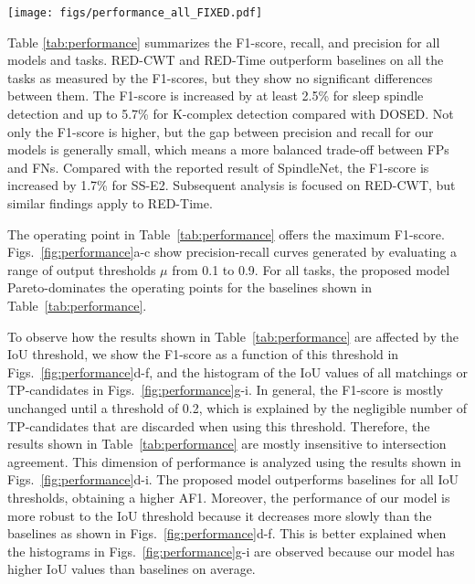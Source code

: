 \documentclass[conference]{IEEEtran}
\begin{document}
\begin{figure*}
\centering \texttt{[image: figs/performance\_all\_FIXED.pdf]}
\caption{
RED-CWT outperforms baselines in the tasks of sleep spindle detection according to expert E1 (first column), sleep spindle detection according to expert E2 (second column), and K-complex detection (third column). (\textbf{a})-(\textbf{c}) Recall and precision when $\text{IoU}\ge 0.2$. In addition, a curve was obtained for our model by varying its output threshold $\mu$. (\textbf{d})-(\textbf{f}) F1-score as a function of the IoU threshold. (\textbf{g})-(\textbf{i}) Histograms of the IoU of matchings (TP-candidates).}
\label{fig:performance}
\end{figure*}


Table \ref{tab:performance} summarizes the F1-score, recall, and precision for all models and tasks. RED-CWT and RED-Time outperform baselines on all the tasks as measured by the F1-scores, but they show no significant differences between them. The F1-score is increased by at least 2.5\% for sleep spindle detection and up to 5.7\% for K-complex detection compared with DOSED. Not only the F1-score is higher, but the gap between precision and recall for our models is generally small, which means a more balanced trade-off between FPs and FNs. Compared with the reported result of SpindleNet, the F1-score is increased by 1.7\% for SS-E2. Subsequent analysis is focused on RED-CWT, but similar findings apply to RED-Time.

The operating point in Table~\ref{tab:performance} offers the maximum F1-score. Figs.~\ref{fig:performance}a-c show precision-recall curves generated by evaluating a range of output thresholds $\mu$ from 0.1 to 0.9. For all tasks, the proposed model Pareto-dominates the operating points for the baselines shown in Table~\ref{tab:performance}.

To observe how the results shown in Table~\ref{tab:performance} are affected by the IoU threshold, we show the F1-score as a function of this threshold in Figs.~\ref{fig:performance}d-f, and the histogram of the IoU values of all matchings or TP-candidates in Figs.~\ref{fig:performance}g-i. In general, the F1-score is mostly unchanged until a threshold of 0.2, which is explained by the negligible number of TP-candidates that are discarded when using this threshold. Therefore, the results shown in Table~\ref{tab:performance} are mostly insensitive to intersection agreement. This dimension of performance is analyzed using the results shown in Figs.~\ref{fig:performance}d-i. The proposed model outperforms baselines for all IoU thresholds, obtaining a higher AF1. Moreover, the performance of our model is more robust to the IoU threshold because it decreases more slowly than the baselines as shown in Figs.~\ref{fig:performance}d-f. This is better explained when the histograms in Figs.~\ref{fig:performance}g-i are observed because our model has higher IoU values than baselines on average. 
\end{document}
